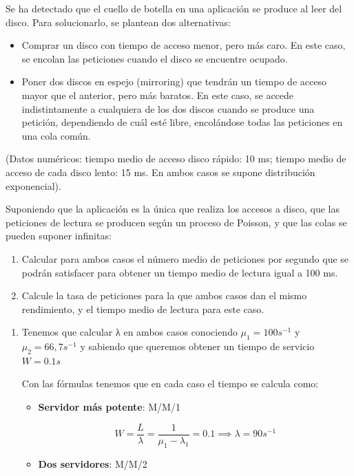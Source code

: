 \begin{problem}[18]\label{tema2:prob18}
Se ha detectado que el cuello de botella en una aplicación se produce al leer del disco. Para solucionarlo, se plantean dos alternativas:
\begin{itemize}
\item Comprar un disco con tiempo de acceso menor, pero más caro. En este caso, se encolan las peticiones cuando el disco se encuentre ocupado.
\item Poner dos discos en espejo (mirroring) que tendrán un tiempo de acceso mayor que el anterior, pero más baratos. En este caso, se accede indistintamente a cualquiera de los dos discos cuando se produce una petición, dependiendo de cuál esté libre, encolándose todas las peticiones en una cola común.
\end{itemize}
(Datos numéricos: tiempo medio de acceso disco rápido: 10 ms; tiempo medio de acceso de cada disco lento: 15 ms. En ambos casos se supone distribución exponencial).

Suponiendo que la aplicación es la única que realiza los accesos a disco, que las peticiones de lectura se producen según un proceso de Poisson, y que las colas se pueden suponer infinitas:
\begin{enumerate}
\item Calcular para ambos casos el número medio de peticiones por segundo que se podrán satisfacer para obtener un tiempo medio de lectura igual a 100 ms.
\item Calcule la tasa de peticiones para la que ambos casos dan el mismo rendimiento, y el tiempo medio de lectura para este caso.
\end{enumerate}

\solution

\yoP

\begin{enumerate}
\item

Tenemos que calcular λ en ambos casos conociendo $μ_1=100s^{-1}$ y $μ_2=66,7s^{-1}$ y sabiendo que queremos obtener un tiempo de servicio $W=0.1s$

Con las fórmulas tenemos que en cada caso el tiempo se calcula como:
\begin{itemize}
\item \textbf{Servidor más potente}: M/M/1

\[W=\frac{L}{λ}=\frac{1}{μ_1-λ_1}=0.1 \implies λ=90 s^{-1}\]

\item \textbf{Dos servidores}: M/M/2


\end{itemize}
\end{enumerate}
\end{problem}
